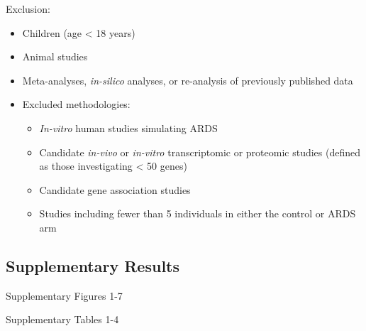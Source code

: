 \documentclass[
  11,
  a4paper,
]{article}
\providecommand{\tightlist}{%
  \setlength{\itemsep}{0pt}\setlength{\parskip}{0pt}}\usepackage{longtable,booktabs,array}
\begin{document}
Exclusion:

\begin{itemize}
\tightlist
\item
  Children (age \textless{} 18 years)
\item
  Animal studies
\item
  Meta-analyses, \emph{in-silico} analyses, or re-analysis of previously
  published data
\item
  Excluded methodologies:

  \begin{itemize}
  \tightlist
  \item
    \emph{In-vitro} human studies simulating ARDS
  \item
    Candidate \emph{in-vivo} or \emph{in-vitro} transcriptomic or
    proteomic studies (defined as those investigating \textless{} 50
    genes)
  \item
    Candidate gene association studies
  \item
    Studies including fewer than 5 individuals in either the control or
    ARDS arm
  \end{itemize}
\end{itemize}

\newpage

\hypertarget{supplementary-results}{%
\subsection{Supplementary Results}\label{supplementary-results}}

Supplementary Figures 1-7

Supplementary Tables 1-4
\end{document}
